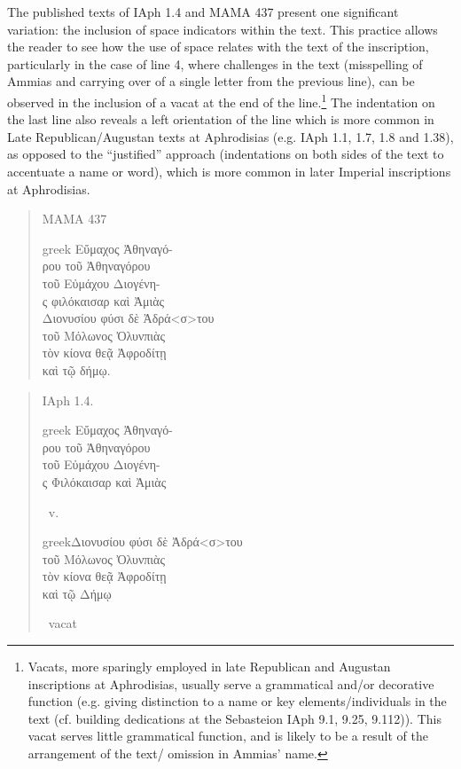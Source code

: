 \documentclass[amsthm,ebook]{saparticle}
\begin{document}
The published texts of IAph 1.4 and MAMA 437 present one significant variation: the inclusion of space indicators within
the text. This practice allows the reader to see how the use of space relates with the text of the inscription,
particularly in the case of line 4, where challenges in the text (misspelling of Ammias and carrying over of a single
letter from the previous line), can be observed in the inclusion of a vacat at the end of the line.\footnote{ Vacats,
more sparingly employed in late Republican and Augustan inscriptions at Aphrodisias, usually serve a grammatical and/or
decorative function (e.g. giving distinction to a name or key elements/individuals in the text (cf. building
dedications at the Sebasteion IAph 9.1, 9.25, 9.112)). This vacat serves little grammatical function, and is likely to
be a result of the arrangement of the text/ omission in Ammias’ name. } The indentation on the last line also reveals
a left orientation of the line which is more common in Late Republican/Augustan texts at Aphrodisias (e.g. IAph 1.1,
1.7, 1.8 and 1.38), as opposed to the ``justified'' approach (indentations on both sides of the text to accentuate a name
or word), which is more common in later Imperial inscriptions at Aphrodisias. 
\newpage
\begin{quotation}
\noindent MAMA 437\\
\begin{otherlanguage*}{greek}
\noindent Εὔμαχος Ἀθηναγό-\\
ρου τοῦ Ἀθηναγόρου\\
τοῦ Εὐμάχου Διογένη-\\
ς φιλόκαισαρ καὶ Ἀμιὰς\\
Διονυσίου φύσι δὲ Ἀδρά\textlatin{<}σ\textlatin{>}του\\
τοῦ Μόλωνος Ὀλυνπιὰς\\
τὸν κίονα θεᾷ Ἀφροδίτῃ\\
καὶ τῷ δήμῳ.
\end{otherlanguage*}

\end{quotation}
\begin{quotation}
\noindent IAph 1.4.\\
\begin{otherlanguage*}{greek}
\noindent Εὔμαχος Ἀθηναγό-\\
ρου τοῦ Ἀθηναγόρου\\
τοῦ Εὐμάχου Διογένη-\\
ς Φιλόκαισαρ καὶ Ἀμιὰς\end{otherlanguage*} v.\\
\begin{otherlanguage*}{greek}Διονυσίου φύσι δὲ Ἀδρά<σ>του\\
τοῦ Μόλωνος Ὀλυνπιὰς\\
τὸν κίονα θεᾷ Ἀφροδίτῃ\\
καὶ τῷ Δήμῳ
\end{otherlanguage*} vacat
\end{quotation}
\end{document}
